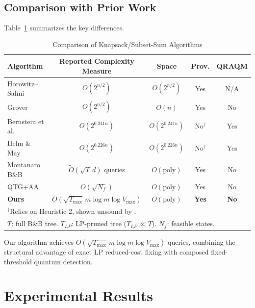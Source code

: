 \documentclass[conference]{IEEEtran} \IEEEoverridecommandlockouts
\begin{document}
\subsection{Comparison with Prior Work}

Table~\ref{tab:comparison} summarizes the key differences.

\begin{table}[htbp] \caption{Comparison of Knapsack/Subset-Sum Algorithms} \label{tab:comparison} \begin{center} \begin{tabular}{lcccc} \toprule \textbf{Algorithm} & \textbf{Reported Complexity Measure} & \textbf{Space} & \textbf{Prov.} & \textbf{QRAQM} \\ \midrule Horowitz--Sahni & $O(2^{n/2})$ & $O(2^{n/2})$ & Yes & N/A \\ Grover & $O(2^{n/2})$ & $O(n)$ & Yes & No \\ Bernstein et al. & $O(2^{0.241n})$ & $O(2^{0.241n})$ & No$^\dagger$ & Yes \\ Helm \& May & $O(2^{0.226n})$ & $O(2^{0.226n})$ & No$^\dagger$ & Yes \\ Montanaro B\&B & $\tilde{O}(\sqrt{T}\,d)$ queries & $O(\text{poly})$ & Yes & No \\ QTG+AA & $O(\sqrt{N_f})$ & $O(\text{poly})$ & Yes & No \\ \textbf{Ours} & $O(\sqrt{T_{\max}}\,m\log m\log V_{\max})$ & $O(\text{poly})$ & \textbf{Yes} & \textbf{No} \\ \bottomrule \multicolumn{5}{l}{\footnotesize $^\dagger$Relies on Heuristic 2, shown unsound by \cite{bonnetain2020improved}.} \\ \multicolumn{5}{l}{\footnotesize $T$: full B\&B tree. $T_{LP}$: LP-pruned tree ($T_{LP} \ll T$). $N_f$: feasible states.} \end{tabular} \end{center} \end{table}

Our algorithm achieves $O\!\left(\sqrt{T_{\max}}\,m\log m\log V_{\max}\right)$ queries, combining the structural advantage of exact LP reduced-cost fixing with composed fixed-threshold quantum detection.




\section{Experimental Results} \label{sec:experiments}
\end{document}
